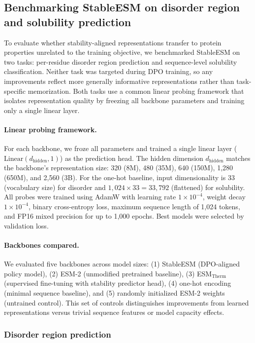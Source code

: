 \subsection{Benchmarking StableESM on disorder region and solubility prediction}\label{sec:disorder_prediction}

To evaluate whether stability-aligned representations transfer to protein properties unrelated to the training objective, we benchmarked StableESM on two tasks: per-residue disorder region prediction and sequence-level solubility classification.
Neither task was targeted during DPO training, so any improvements reflect more generally informative representations rather than task-specific memorization.
Both tasks use a common linear probing framework that isolates representation quality by freezing all backbone parameters and training only a single linear layer.

\paragraph{Linear probing framework.}
For each backbone, we froze all parameters and trained a single linear layer ($\text{Linear}(d_{\text{hidden}}, 1)$) as the prediction head.
The hidden dimension $d_{\text{hidden}}$ matches the backbone's representation size: 320 (8M), 480 (35M), 640 (150M), 1{,}280 (650M), and 2{,}560 (3B).
For the one-hot baseline, input dimensionality is 33 (vocabulary size) for disorder and $1{,}024 \times 33 = 33{,}792$ (flattened) for solubility.
All probes were trained using AdamW with learning rate $1 \times 10^{-4}$, weight decay $1 \times 10^{-4}$, binary cross-entropy loss, maximum sequence length of 1{,}024 tokens, and FP16 mixed precision for up to 1{,}000 epochs.
Best models were selected by validation loss.

\paragraph{Backbones compared.}
We evaluated five backbones across model sizes: (1) StableESM (DPO-aligned policy model), (2) ESM-2 (unmodified pretrained baseline), (3) ESM$_{\text{Therm}}$ (supervised fine-tuning with stability predictor head), (4) one-hot encoding (minimal sequence baseline), and (5) randomly initialized ESM-2 weights (untrained control).
This set of controls distinguishes improvements from learned representations versus trivial sequence features or model capacity effects.

\subsubsection{Disorder region prediction}

